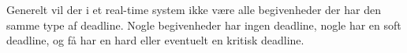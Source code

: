 Generelt vil der i et real-time system ikke være alle begivenheder der har den samme type af deadline. Nogle begivenheder har ingen deadline, nogle har en soft deadline, og få har en hard eller eventuelt en kritisk deadline. 
 








